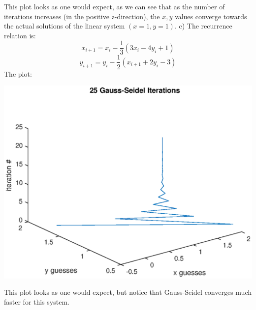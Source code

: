 \documentclass{article}
\begin{document}
This plot looks as one would expect, as we can see that as the number of iterations increases (in the positive z-direction), the $x, y$ values converge towards the actual solutions of the linear system $(x = 1, y = 1)$.
\newpage
c) The recurrence relation is: \[x_{i+1} = x_i-\frac{1}{3}(3x_i-4y_i+1)\] \[y_{i+1} = y_i-\frac{1}{2}(x_{i+1}+2y_i-3)\]
The plot:
\begin{center}
    \includegraphics[scale = 0.8]{gs25.eps}
\end{center}
This plot looks as one would expect, but notice that Gauss-Seidel converges much faster for this system.
\newpage
\end{document}
